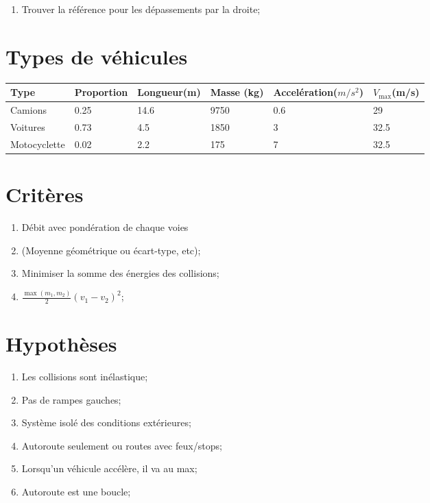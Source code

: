 \documentclass[12pt]{article}
\begin{document}
\begin{enumerate}
    \item Trouver la r\'ef\'erence pour les d\'epassements par la droite;
\end{enumerate}

\section{Types de v\'ehicules}
\begin{table}[h]
    \begin{tabular}{|l|l|l|l|l|l|}\hline
        Type &Proportion &Longueur(m) &Masse (kg) &Accel\'eration($m/s^2$) &$V_{\max}$(m/s)\\\hline
        Camions &0.25 &14.6 &9750 &0.6 &29\\\hline
        Voitures &0.73 &4.5 &1850 &3 &32.5\\\hline
        Motocyclette &0.02 &2.2 &175 &7 &32.5\\\hline
    \end{tabular}
\end{table}

\section{Crit\`eres}
\begin{enumerate}
    \item D\'ebit avec pond\'eration de chaque voies
    \item[] (Moyenne g\'eom\'etrique ou \'ecart-type, etc);
    \item Minimiser la somme des \'energies des collisions;
    \item[] $\frac{\max(m_1,m_2)}2(v_1-v_2)^2$;
\end{enumerate}

\section{Hypoth\`eses}
\begin{enumerate}
    \item Les collisions sont in\'elastique;
    \item Pas de rampes gauches;
    \item Syst\`eme isol\'e des conditions ext\'erieures;
    \item Autoroute seulement ou routes avec feux/stops;
    \item Lorsqu'un v\'ehicule acc\'el\`ere, il va au max;
    \item Autoroute est une boucle;
\end{enumerate}
\end{document}
